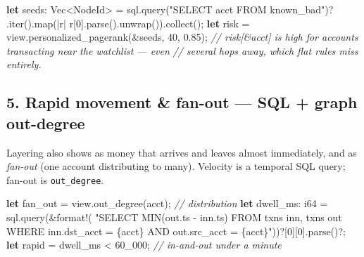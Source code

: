 \documentclass[
  11pt,
  openany]{book}
\newenvironment{Shaded}{}{}
\newcommand{\CommentTok}[1]{\textcolor[rgb]{0.38,0.63,0.69}{\textit{#1}}}
\newcommand{\DataTypeTok}[1]{\textcolor[rgb]{0.56,0.13,0.00}{#1}}
\newcommand{\DecValTok}[1]{\textcolor[rgb]{0.25,0.63,0.44}{#1}}
\newcommand{\KeywordTok}[1]{\textcolor[rgb]{0.00,0.44,0.13}{\textbf{#1}}}
\newcommand{\NormalTok}[1]{#1}
\newcommand{\OperatorTok}[1]{\textcolor[rgb]{0.40,0.40,0.40}{#1}}
\newcommand{\PreprocessorTok}[1]{\textcolor[rgb]{0.74,0.48,0.00}{#1}}
\newcommand{\StringTok}[1]{\textcolor[rgb]{0.25,0.44,0.63}{#1}}
\begin{document}
\begin{Shaded}
\begin{Highlighting}[]
\KeywordTok{let}\NormalTok{ seeds}\OperatorTok{:} \DataTypeTok{Vec}\OperatorTok{\textless{}}\NormalTok{NodeId}\OperatorTok{\textgreater{}} \OperatorTok{=}\NormalTok{ sql}\OperatorTok{.}\NormalTok{query(}\StringTok{"SELECT acct FROM known\_bad"}\NormalTok{)}\OperatorTok{?}
    \OperatorTok{.}\NormalTok{iter()}\OperatorTok{.}\NormalTok{map(}\OperatorTok{|}\NormalTok{r}\OperatorTok{|}\NormalTok{ r[}\DecValTok{0}\NormalTok{]}\OperatorTok{.}\NormalTok{parse()}\OperatorTok{.}\NormalTok{unwrap())}\OperatorTok{.}\NormalTok{collect()}\OperatorTok{;}
\KeywordTok{let}\NormalTok{ risk }\OperatorTok{=}\NormalTok{ view}\OperatorTok{.}\NormalTok{personalized\_pagerank(}\OperatorTok{\&}\NormalTok{seeds}\OperatorTok{,} \DecValTok{40}\OperatorTok{,} \DecValTok{0.85}\NormalTok{)}\OperatorTok{;}
\CommentTok{// risk[\&acct] is high for accounts transacting near the watchlist — even}
\CommentTok{// several hops away, which flat rules miss entirely.}
\end{Highlighting}
\end{Shaded}

\subsection{5. Rapid movement \& fan-out --- SQL + graph
out-degree}\label{rapid-movement-fan-out-sql-graph-out-degree}

Layering also shows as money that arrives and leaves almost immediately,
and as \emph{fan-out} (one account distributing to many). Velocity is a
temporal SQL query; fan-out is \texttt{out\_degree}.

\begin{Shaded}
\begin{Highlighting}[]
\KeywordTok{let}\NormalTok{ fan\_out }\OperatorTok{=}\NormalTok{ view}\OperatorTok{.}\NormalTok{out\_degree(acct)}\OperatorTok{;}                   \CommentTok{// distribution}
\KeywordTok{let}\NormalTok{ dwell\_ms}\OperatorTok{:} \DataTypeTok{i64} \OperatorTok{=}\NormalTok{ sql}\OperatorTok{.}\NormalTok{query(}\OperatorTok{\&}\PreprocessorTok{format!}\NormalTok{(}
    \StringTok{"SELECT MIN(out.ts {-} inn.ts) FROM txns inn, txns out}
\StringTok{     WHERE inn.dst\_acct = \{acct\} AND out.src\_acct = \{acct\}"}\NormalTok{))}\OperatorTok{?}\NormalTok{[}\DecValTok{0}\NormalTok{][}\DecValTok{0}\NormalTok{]}\OperatorTok{.}\NormalTok{parse()}\OperatorTok{?;}
\KeywordTok{let}\NormalTok{ rapid }\OperatorTok{=}\NormalTok{ dwell\_ms }\OperatorTok{\textless{}} \DecValTok{60\_000}\OperatorTok{;}                          \CommentTok{// in{-}and{-}out under a minute}
\end{Highlighting}
\end{Shaded}
\end{document}

